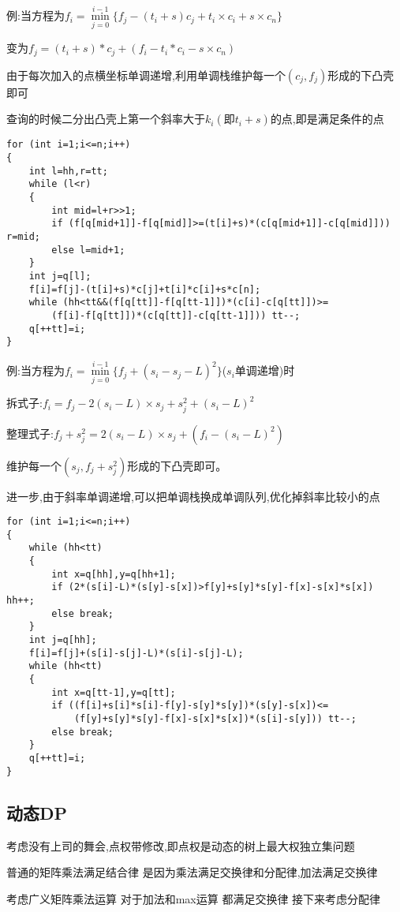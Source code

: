 \documentclass[a4paper]{ctexart}
\begin{document}
例:当方程为$f_i=\min\limits_{j=0}^{i-1}\{f_j-(t_i+s)c_j+t_i\times c_i+s\times c_n\}$

变为$f_j=(t_i+s)*c_j+(f_i-t_i*c_i-s\times c_n)$

由于每次加入的点横坐标单调递增,利用单调栈维护每一个$(c_j,f_j)$形成的下凸壳即可

查询的时候二分出凸壳上第一个斜率大于$k_i(即t_i+s)$的点,即是满足条件的点

\begin{lstlisting}
for (int i=1;i<=n;i++)
{
    int l=hh,r=tt;
    while (l<r)
    {
        int mid=l+r>>1;
        if (f[q[mid+1]]-f[q[mid]]>=(t[i]+s)*(c[q[mid+1]]-c[q[mid]])) r=mid;
        else l=mid+1;
    }
    int j=q[l];
    f[i]=f[j]-(t[i]+s)*c[j]+t[i]*c[i]+s*c[n];
    while (hh<tt&&(f[q[tt]]-f[q[tt-1]])*(c[i]-c[q[tt]])>=
        (f[i]-f[q[tt]])*(c[q[tt]]-c[q[tt-1]])) tt--;
    q[++tt]=i;
}
\end{lstlisting}

例:当方程为$f_i=\min\limits_{j=0}^{i-1}\{f_j+(s_i-s_j-L)^2\}$($s_i$单调递增)时

拆式子:$f_i=f_j-2(s_i-L)\times s_j+s_j^2+(s_i-L)^2$

整理式子:$f_j+s_j^2=2(s_i-L)\times s_j+(f_i-(s_i-L)^2)$

维护每一个$(s_j,f_j+s_j^2)$形成的下凸壳即可。

进一步,由于斜率单调递增,可以把单调栈换成单调队列,优化掉斜率比较小的点


\begin{lstlisting}
for (int i=1;i<=n;i++)
{
    while (hh<tt)
    {
        int x=q[hh],y=q[hh+1];
        if (2*(s[i]-L)*(s[y]-s[x])>f[y]+s[y]*s[y]-f[x]-s[x]*s[x]) hh++;
        else break;
    }
    int j=q[hh];
    f[i]=f[j]+(s[i]-s[j]-L)*(s[i]-s[j]-L);
    while (hh<tt)
    {
        int x=q[tt-1],y=q[tt];
        if ((f[i]+s[i]*s[i]-f[y]-s[y]*s[y])*(s[y]-s[x])<=
            (f[y]+s[y]*s[y]-f[x]-s[x]*s[x])*(s[i]-s[y])) tt--;
        else break;
    }
    q[++tt]=i;
}
\end{lstlisting}

\subsection{动态DP}

考虑没有上司的舞会,点权带修改,即点权是动态的树上最大权独立集问题

普通的矩阵乘法满足结合律 是因为乘法满足交换律和分配律,加法满足交换律

考虑广义矩阵乘法运算 对于加法和max运算 都满足交换律 接下来考虑分配律
\end{document}
